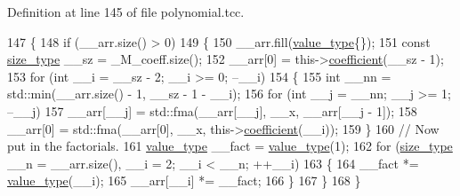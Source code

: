 Definition at line 145 of file polynomial.\+tcc.


\begin{DoxyCode}
147       \{
148         \textcolor{keywordflow}{if} (\_\_arr.size() > 0)
149           \{
150             \_\_arr.fill(\hyperlink{class____gnu__cxx_1_1__Polynomial_a725563351f50e76084a7a016c06f8a53}{value\_type}\{\});
151             \textcolor{keyword}{const} \hyperlink{class____gnu__cxx_1_1__Polynomial_a6afe219c123c7a2fdc5abac8a6639053}{size\_type} \_\_sz = \_M\_coeff.size();
152             \_\_arr[0] = this->\hyperlink{class____gnu__cxx_1_1__Polynomial_a7cee31b3acbe8c024af6d696bc610f49}{coefficient}(\_\_sz - 1);
153             \textcolor{keywordflow}{for} (\textcolor{keywordtype}{int} \_\_i = \_\_sz - 2; \_\_i >= 0; --\_\_i)
154               \{
155                 \textcolor{keywordtype}{int} \_\_nn = std::min(\_\_arr.size() - 1, \_\_sz - 1 - \_\_i);
156                 \textcolor{keywordflow}{for} (\textcolor{keywordtype}{int} \_\_j = \_\_nn; \_\_j >= 1; --\_\_j)
157                   \_\_arr[\_\_j] = std::fma(\_\_arr[\_\_j], \_\_x, \_\_arr[\_\_j - 1]);
158                 \_\_arr[0] = std::fma(\_\_arr[0], \_\_x, this->\hyperlink{class____gnu__cxx_1_1__Polynomial_a7cee31b3acbe8c024af6d696bc610f49}{coefficient}(\_\_i));
159               \}
160             \textcolor{comment}{//  Now put in the factorials.}
161             \hyperlink{class____gnu__cxx_1_1__Polynomial_a725563351f50e76084a7a016c06f8a53}{value\_type} \_\_fact = \hyperlink{class____gnu__cxx_1_1__Polynomial_a725563351f50e76084a7a016c06f8a53}{value\_type}(1);
162             \textcolor{keywordflow}{for} (\hyperlink{class____gnu__cxx_1_1__Polynomial_a6afe219c123c7a2fdc5abac8a6639053}{size\_type} \_\_n = \_\_arr.size(), \_\_i = 2; \_\_i < \_\_n; ++\_\_i)
163               \{
164                 \_\_fact *= \hyperlink{class____gnu__cxx_1_1__Polynomial_a725563351f50e76084a7a016c06f8a53}{value\_type}(\_\_i);
165                 \_\_arr[\_\_i] *= \_\_fact;
166               \}
167           \}
168       \}
\end{DoxyCode}
\mbox{\label{class____gnu__cxx_1_1__Polynomial_a2251cb8f6518118c78494f4eb015ed8f}} 
